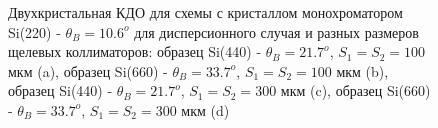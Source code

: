 \begin{figure}[H]
  \centering
  \hfill
  \hfill
  \hfill
  \caption{Двухкристальная КДО для схемы с кристаллом монохроматором Si(220) - $\theta_B = 10.6^o$
  для дисперсионного случая и разных размеров щелевых коллиматоров:
  образец Si(440) - $\theta_B = 21.7^o$, $S_1 = S_2 = 100$ мкм (a),
   образец Si(660) - $\theta_B = 33.7^o$, $S_1 = S_2 = 100$ мкм (b),
    образец Si(440) - $\theta_B = 21.7^o$, $S_1 = S_2 = 300$ мкм (c),
     образец Si(660) - $\theta_B = 33.7^o$, $S_1 = S_2 = 300$ мкм (d)}
  \label{ris:disspersion_curves_expantheory}
\end{figure}

